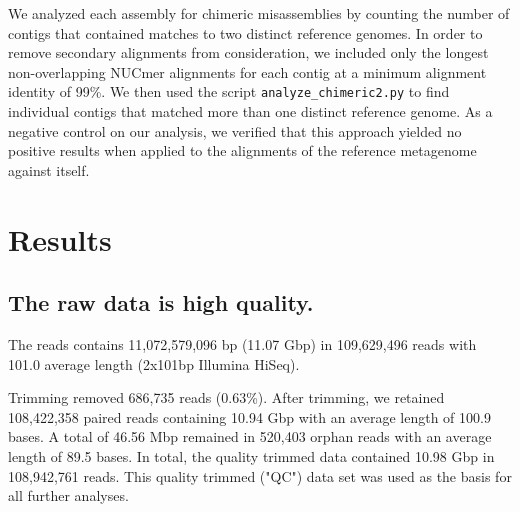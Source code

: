 \documentclass[11pt]{article}
\begin{document}

We analyzed each assembly for chimeric misassemblies by counting the
number of contigs that contained matches to two distinct reference
genomes.  In order to remove secondary alignments from consideration,
we included only the longest non-overlapping NUCmer
alignments for each contig at a minimum alignment identity of 99\%.
We then used the script {\tt analyze\_chimeric2.py} to find individual
contigs that matched more than one distinct reference genome.  As a
negative control on our analysis, we verified that this approach
yielded no positive results when applied to the alignments of the
reference metagenome against itself.




\section*{Results}

\subsection*{The raw data is high quality.}

The reads contains 11,072,579,096 bp (11.07 Gbp) in 109,629,496 reads
with 101.0 average length (2x101bp Illumina HiSeq).

Trimming removed 686,735 reads (0.63\%).  After trimming, we retained
108,422,358 paired reads containing 10.94 Gbp with an average length of
100.9 bases. A total of 46.56 Mbp remained in 520,403 orphan reads with
an average length of 89.5 bases. In total, the quality trimmed data
contained 10.98 Gbp in 108,942,761 reads.  This quality trimmed ("QC")
data set was used as the basis for all further analyses.
\end{document}
